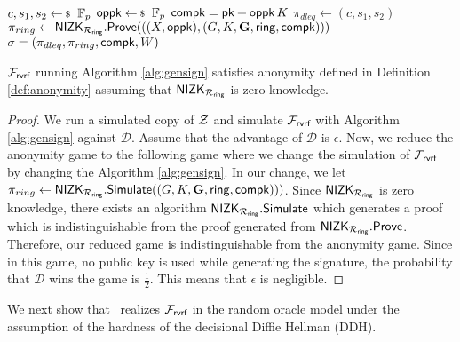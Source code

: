 \begin{algorithm}
	\caption{$\gen_{sign}(\ring,W,\pk,m)$}
	\label{alg:gensign}	 	
	\begin{algorithmic}[1]
		\State $ c,s_1, s_2 \leftsample \FF_p $
		\State $ \openpk \leftsample \FF_p $
		\State $ \mathsf{compk} =  \mathsf{pk} + \mathsf{oppk} \, K$
		\State $ \pi_{dleq}  \leftarrow (c,s_1, s_2)$
		\State $ \pi_{ring} \leftarrow {\ensuremath{\mathsf{NIZK}}}_{\mathcal{R}_{\mathsf{ring}}}.{\mathsf{Prove}}(((X, \mathsf{oppk}),(G,K,{\mathbf{G}},\mathsf{ring}, \mathsf{compk}))) $ 
		\State\Return$ \sigma = (\pi_{dleq},\pi_{ring},\mathsf{compk},W) $
	\end{algorithmic}
	
\end{algorithm}


\begin{lemma} $ \mathcal{F}_{\textsf{rvrf}} $ running Algorithm \ref{alg:gensign} satisfies anonymity defined in Definition \ref{def:anonymity} assuming that $ {\mathsf{NIZK}}_{\mathcal{R}_{\mathsf{ring}}} $ is zero-knowledge.
\end{lemma}

\begin{proof}
	We run a simulated copy of $ \mathcal{Z} $ and simulate $ \mathcal{F}_{\textsf{rvrf}} $ with Algorithm \ref{alg:gensign} against $ \mathcal{D} $. Assume that the advantage of $ \mathcal{D} $ is $ \epsilon $. Now, we reduce the anonymity game to the following game where we change the simulation of $ \mathcal{F}_{\textsf{rvrf}} $ by changing the Algorithm \ref{alg:gensign}. In our change, we let $ \pi_{ring} \leftarrow {\ensuremath{\mathsf{NIZK}}}_{\mathcal{R}_{\mathsf{ring}}}.\mathsf{Simulate}((G,K,{\mathbf{G}},\mathsf{ring}, \mathsf{compk}))) $. Since $ {\mathsf{NIZK}}_{\mathcal{R}_{\mathsf{ring}}} $ is zero knowledge, there exists an algorithm  $ {\mathsf{NIZK}}_{\mathcal{R}_{\mathsf{ring}}}.\mathsf{Simulate} $ which generates a proof which is indistinguishable from the proof generated from $ {\mathsf{NIZK}}_{\mathcal{R}_{\mathsf{ring}}}.{\mathsf{Prove}} $. Therefore, our reduced game is indistinguishable from the anonymity game. Since in this game, no public key is used while generating the signature, the probability that  $ \mathcal{D} $ wins the game is $ \frac{1}{2} $. This means that $ \epsilon $ is negligible.		
\end{proof}

We next show that \name \ realizes $ \mathcal{F}_{\textsf{rvrf}} $  in the random oracle model under the assumption of the hardness of the decisional Diffie Hellman (DDH).


